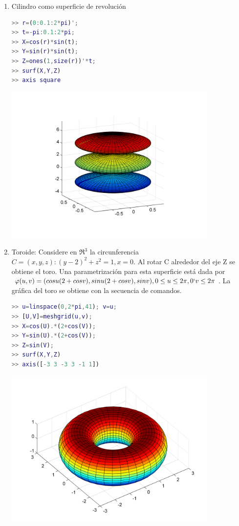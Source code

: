 \begin{enumerate}
\item Cilindro como superficie de revolución
\begin{lstlisting}[language=Matlab]
>> r=(0:0.1:2*pi)'; 
>> t=-pi:0.1:2*pi; 
>> X=cos(r)*sin(t); 
>> Y=sin(r)*sin(t); 
>> Z=ones(1,size(r))'*t; 
>> surf(X,Y,Z) 
>> axis square
\end{lstlisting}
\includegraphics[width=300pt]{./Imagenes/cilindsupf.png}

\item Toroide: Considere en $\Re^{3}$ la circunferencia $C={(x,y,z):(y-2)^{2}+z^{2}=1, x=0}$. 
Al rotar C alrededor del eje Z se obtiene el toro. Una parametrización para esta superficie está dada por $\varphi(u,v) = (cos u(2+cos v),sin u(2+cos v),sin v), 0 \leq u \leq 2\pi ,0 \lq v \leq 2\pi$. 
La gráfica del toro se obtiene con la secuencia de comandos. 

\begin{lstlisting}[language=Matlab]
>> u=linspace(0,2*pi,41); v=u; 
>> [U,V]=meshgrid(u,v); 
>> X=cos(U).*(2+cos(V)); 
>> Y=sin(U).*(2+cos(V)); 
>> Z=sin(V); 
>> surf(X,Y,Z) 
>> axis([-3 3 -3 3 -1 1])
\end{lstlisting}
\includegraphics[width=300pt]{./Imagenes/toroide.png}



\end{enumerate}
